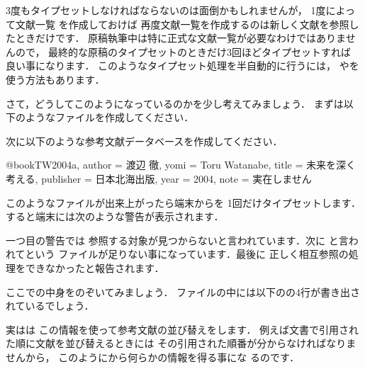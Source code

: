 3度もタイプセットしなければならないのは面倒かもしれませんが，
1度{\JBibTeX}によって文献一覧 を作成しておけば
再度文献一覧を作成するのは新しく文献を参照したときだけです．
原稿執筆中は特に正式な文献一覧が必要なわけではありませんので，
最終的な原稿のタイプセットのときだけ3回ほどタイプセットすれば
良い事になります．
このようなタイプセット処理を半自動的に行うには，
やを使う方法もあります．



さて，どうしてこのようになっているのかを少し考えてみましょう．
まずは以下のようなファイルを作成してください．


次に以下のような参考文献データベースを作成してください．

\begin{intext}
@book{TW2004a,
author    = {渡辺 徹},
yomi      = {Toru Watanabe},
title     = {未来を深く考える},
publisher = {日本北海出版},
year      = {2004},
note      = {実在しません}}
\end{intext}

このようなファイルが出来上がったら端末からを
1回だけタイプセットします．すると端末には次のような警告が表示されます．


一つ目の警告では
参照する対象が見つからないと言われています．次に
と言われてという
ファイルが足りない事になっています．最後に
正しく相互参照の処理をできなかったと報告されます．

%
ここでの中身をのぞいてみましょう．
ファイルの中には以下のの4行が書き出されているでしょう．

\begin{intext}
\relax
{}
\end{intext}

実は{\JBibTeX}は
この情報を使って参考文献の並び替えをします．
例えば文書で引用された順に文献を並び替えるときには
その引用された順番が分からなければなりませんから，
このようにから何らかの情報を得る事にな
るのです．

